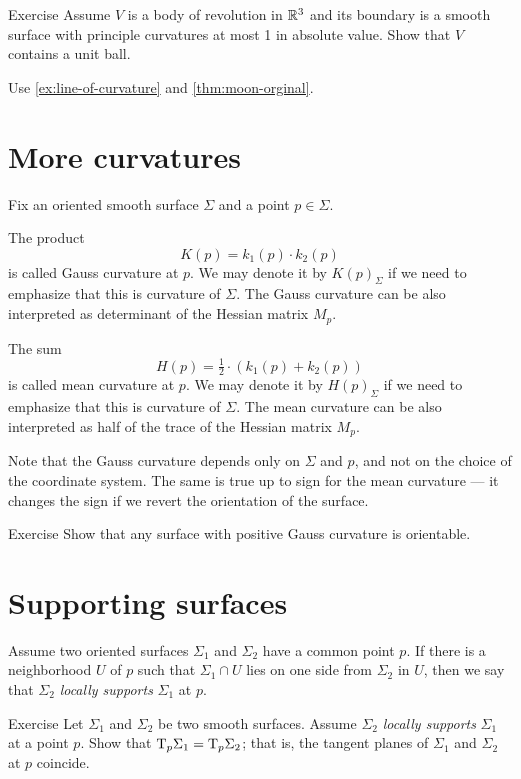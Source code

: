 \begin{thm}{Exercise}\label{ex:moon-revolution}
Assume $V$ is a body of revolution in $\mathbb{R}^3$ and its boundary is a smooth surface with principle curvatures at most 1 in absolute value.
Show that $V$ contains a unit ball.
\end{thm}

 Use \ref{ex:line-of-curvature} and \ref{thm:moon-orginal}.

\section*{More curvatures}

Fix an oriented smooth surface $\Sigma$ and a point $p\in\Sigma$.

The product 
\[K(p)=k_1(p)\cdot k_2(p)\]
is called Gauss curvature at $p$.
We may denote it by $K(p)_\Sigma$ if we need to emphasize that this is curvature of $\Sigma$.
The Gauss curvature can be also interpreted as determinant of the Hessian matrix $M_p$.

The sum 
\[H(p)=\tfrac12\cdot(k_1(p)+ k_2(p))\] %
is called mean curvature at $p$.
We may denote it by $H(p)_\Sigma$ if we need to emphasize that this is curvature of $\Sigma$.
The mean curvature can be also interpreted as half of the trace of the Hessian matrix $M_p$. %

Note that the Gauss curvature depends only on $\Sigma$ and $p$,
and not on the choice of the coordinate system.
The same is true up to sign for the mean curvature --- it changes the sign if we revert the orientation of the surface.

\begin{thm}{Exercise}\label{ex:gauss+orientable}
Show that any surface with positive Gauss curvature is orientable. 
\end{thm}


\section*{Supporting surfaces}

Assume two oriented surfaces $\Sigma_1$ and $\Sigma_2$ have a common point $p$.
If there is a neighborhood $U$ of $p$ such that $\Sigma_1\cap U$ lies on one side from $\Sigma_2$ in $U$, then we say that $\Sigma_2$ \emph{locally supports} $\Sigma_1$ at $p$.

\begin{thm}{Exercise}\label{ex:T=T}
Let $\Sigma_1$ and $\Sigma_2$ be two smooth surfaces.
Assume $\Sigma_2$ \emph{locally supports} $\Sigma_1$ at a point $p$.
Show that $\mathrm{T}_p\Sigma_1=\mathrm{T}_p\Sigma_2$;
that is, the tangent planes of $\Sigma_1$ and $\Sigma_2$ at $p$ coincide.
\end{thm}

